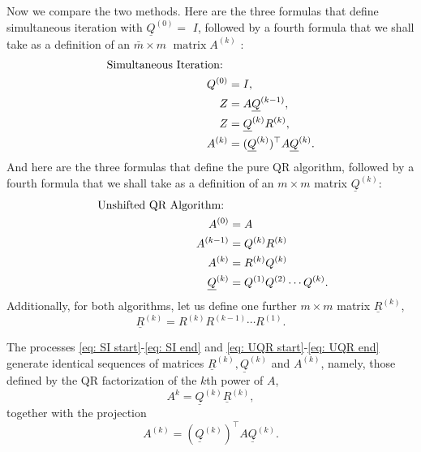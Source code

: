 Now we compare the two methods. Here are the three formulas that define simultaneous iteration with $\underline{Q}^{(0)}=$ $I$, followed by a fourth formula that we shall take as a definition of an $\bar{m} \times m$ $\operatorname{matrix} A^{(k)}$ :
\begin{align}
    \text{Simultaneous Iteration: } & \notag\\ 
    Q^{(0)}& = I, \label{eq: SI start}\\ 
    Z & = A\underline Q^{(k-1)}, \\ 
    Z & = \underline Q ^{(k)} R^{(k)}, \\ 
    A^{(k)} &= (\underline Q ^{(k)})^\top  A \underline Q ^{(k)}. \label{eq: SI end}
\end{align}
And here are the three formulas that define the pure QR algorithm, followed by a fourth formula that we shall take as a definition of an $m\times m$ matrix $\underline Q^{(k)}$: 
\begin{align}
    \text{ Unshifted QR Algorithm: } &\notag \\ 
        A^{(0)} & =A \label{eq: UQR start} \\
        A^{(k-1)} & =Q^{(k)} R^{(k)} \\
        A^{(k)} & =R^{(k)} Q^{(k)} \\
        \underline{Q}^{(k)} & =Q^{(1)} Q^{(2)} \cdots Q^{(k)} \label{eq: UQR end}.
\end{align}
Additionally, for both algorithms, let us define one further $m\times m$ matrix $\underline R ^{(k)}$, 
\begin{equation}
\label{eq: underline Rk}
    \underline R ^{(k)} = R^{(k)} R ^{(k-1)}\cdots R^{(1)}. 
\end{equation}

 
 \begin{theorem}
 \label{thm: equiv sim iter QR}
 The processes \eqref{eq: SI start}-\eqref{eq: SI end} and \eqref{eq: UQR start}-\eqref{eq: UQR end} generate identical sequences of matrices $\underline R^{(k)}, \underline Q^{(k)}$ and $ A^{(k)} $, namely, those defined by the QR factorization of the $k$th power of $A$, 
 \begin{equation}
 \label{eq: QR Ak}
    A^{k} = \underline Q ^{(k)} \underline R ^{(k)},
 \end{equation}
 together with the projection 
 \begin{equation}
 \label{eq: A bk projection QR}
    A^{(k)} = (\underline Q ^{(k)}) ^\top  A \underline Q^{(k)}. 
 \end{equation}
 \end{theorem}
 

